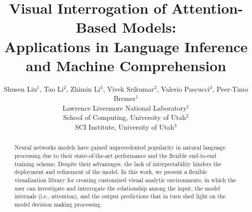 \documentclass[11pt,a4paper]{article}
\title{Visual Interrogation of Attention-Based Models: \\ Applications in Language Inference and Machine Comprehension}
\author{Shusen Liu$^{1}$, Tao Li$^{2}$,  Zhimin Li$^{3}$,  Vivek Srikumar$^{2}$, Valerio Pascucci$^{3}$, Peer-Timo Bremer$^{1}$ \\
  Lawrence Livermore National Laboratory$^{1}$\\
  School of Computing, University of Utah$^{2}$\\  
  SCI Institute, University of Utah$^{3}$\\
}
\begin{document}
\maketitle


\begin{abstract}
Neural networks models have gained unprecedented popularity in natural language processing due to their state-of-the-art performance and the flexible end-to-end training scheme. Despite their advantages, the lack of interpretability hinders the deployment and refinement of the model.
%
In this work, we present a flexible visualization library for creating customized visual analytic environments, in which the user can investigate and interrogate the relationship among the input, the model internals (i.e., attention), and the output predictions that in turn shed light on the model decision making processing.
 
\end{abstract}










\end{document}
